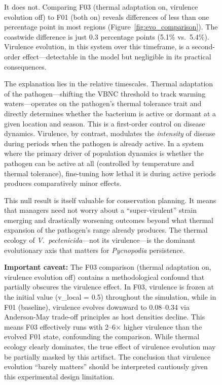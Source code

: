 \begin{figure}[!htbp]
It does not. Comparing F03 (thermal adaptation on, virulence evolution off)
to F01 (both on) reveals differences of less than one percentage point in
most regions (Figure~\ref{fig:evo_comparison}). The coastwide difference is
just 0.3 percentage points (5.1\% vs.\ 5.4\%). Virulence evolution, in this
system over this timeframe, is a second-order effect---detectable in the model
but negligible in its practical consequences.

The explanation lies in the relative timescales. Thermal adaptation of the
pathogen---shifting the VBNC threshold to track warming waters---operates on
the pathogen's thermal tolerance trait and directly determines whether the
bacterium is active or dormant at a given location and season. This is a
first-order control on disease dynamics. Virulence, by contrast, modulates
the \textit{intensity} of disease during periods when the pathogen is already
active. In a system where the primary driver of population dynamics is whether
the pathogen can be active at all (controlled by temperature and thermal
tolerance), fine-tuning how lethal it is during active periods produces
comparatively minor effects.

This null result is itself valuable for conservation planning. It means that
managers need not worry about a ``super-virulent'' strain emerging and
drastically worsening outcomes beyond what thermal expansion of the pathogen's
range already produces. The thermal ecology of \textit{V.\ pectenicida}---not
its virulence---is the dominant evolutionary axis that matters for
\textit{Pycnopodia} persistence.

\textbf{Important caveat:} The F03 comparison (thermal adaptation on, virulence 
evolution off) contains a methodological confound that partially obscures the 
virulence effect. In F03, virulence is frozen at the initial value (v\_local = 0.5) 
throughout the simulation, while in F01 (baseline), virulence evolves downward 
to 0.08--0.34 via Anderson-May trade-off principles as host densities decline. 
This means F03 effectively runs with 2--6× higher virulence than the evolved 
F01 state, confounding the comparison. While thermal ecology clearly dominates, 
the true effect of virulence evolution may be partially masked by this artifact. 
The conclusion that virulence evolution ``barely matters'' should be interpreted 
cautiously given this experimental design limitation.


\end{figure}
